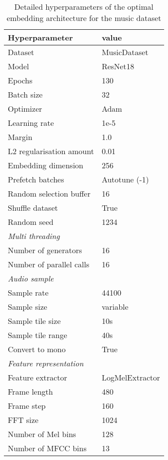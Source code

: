 \begin{table}[H]
    \centering
    \caption{Detailed hyperparameters of the optimal embedding architecture for the music dataset}
	\label{tab:Hyperparameters-Detailed-Music}
    \begin{tabular}{l|l}
        \toprule
        \textbf{Hyperparameter} & \textbf{value} \\ 
        \midrule[1pt]
        Dataset & MusicDataset \\
        \hline
        Model & ResNet18 \\ 
        \hline
        Epochs & 130 \\ 
        \hline
        Batch size & 32 \\ 
        \hline
        Optimizer & Adam \\ 
        \hline
        Learning rate & 1e-5 \\
        \hline
        Margin & 1.0 \\
        \hline
        L2 regularisation amount & 0.01 \\
        \hline
        Embedding dimension & 256 \\
        \hline
        Prefetch batches & Autotune (-1) \\ 
        \hline
        Random selection buffer & 16 \\ 
        \hline
        Shuffle dataset & True \\
        \hline
        Random seed & 1234 \\
        \midrule[1pt]
        \multicolumn{2}{l}{\textit{Multi threading}} \\
        \midrule[1pt]
        Number of generators & 16 \\ 
        \hline
        Number of parallel calls & 16 \\
        \midrule[1pt]
        \multicolumn{2}{l}{\textit{Audio sample}} \\
        \midrule[1pt]
        Sample rate & 44100 \\ 
        \hline
        Sample size & variable \\
        \hline
        Sample tile size & 10s \\
        \hline
        Sample tile range & 40s \\
        \hline
        Convert to mono & True \\
        \midrule[1pt]
        \multicolumn{2}{l}{\textit{Feature representation}} \\
        \midrule[1pt]
        Feature extractor & LogMelExtractor \\ 
        \hline
        Frame length & 480 \\
        \hline
        Frame step & 160 \\
        \hline
        FFT size & 1024 \\
        \hline
        Number of Mel bins & 128 \\
        \hline
        Number of MFCC bins & 13 \\
        \bottomrule
    \end{tabular}
\end{table}

